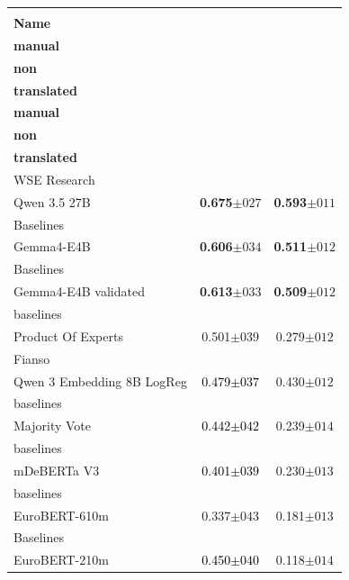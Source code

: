 \begin{tabularx}{\textwidth}{X | c c}
\hline
\makecell[b]{\textbf{Model} \\ \textbf{Name}} & \makecell[b]{\textbf{Addi} \\ \textbf{manual} \\ \textbf{non} \\ \textbf{translated}} & \makecell[b]{\textbf{PISA} \\ \textbf{manual} \\ \textbf{non} \\ \textbf{translated}} \\
\hline
WSE Research\\\subcatarrow{}Qwen 3.5 27B & \textbf{\textcolor{BrickRed}{0.675$\pm{}027$}} & \textbf{\textcolor{BrickRed}{0.593$\pm{}011$}} \\
Baselines\\\subcatarrow{}Gemma4-E4B & \textbf{\textcolor{White!50!BrickRed}{0.606$\pm{}034$}} & \textbf{\textcolor{White!50!BrickRed}{0.511$\pm{}012$}} \\
Baselines\\\subcatarrow{}Gemma4-E4B validated & \textbf{\textcolor{White!50!BrickRed}{0.613$\pm{}033$}} & \textbf{\textcolor{White!50!BrickRed}{0.509$\pm{}012$}} \\
baselines\\\subcatarrow{}Product Of Experts & \textcolor{White!50!BrickRed}{0.501$\pm{}039$} & \textcolor{White!50!NavyBlue}{0.279$\pm{}012$} \\
Fianso\\\subcatarrow{}Qwen 3 Embedding 8B LogReg & \textcolor{Black}{0.479$\pm{}037$} & \textcolor{White!50!BrickRed}{0.430$\pm{}012$} \\
baselines\\\subcatarrow{}Majority Vote & \textcolor{Black}{0.442$\pm{}042$} & \textcolor{White!50!NavyBlue}{0.239$\pm{}014$} \\
baselines\\\subcatarrow{}mDeBERTa V3 & \textcolor{Black}{0.401$\pm{}039$} & \textcolor{White!50!NavyBlue}{0.230$\pm{}013$} \\
baselines\\\subcatarrow{}EuroBERT-610m & \textcolor{White!50!NavyBlue}{0.337$\pm{}043$} & \textcolor{White!50!NavyBlue}{0.181$\pm{}013$} \\
Baselines\\\subcatarrow{}EuroBERT-210m & \textcolor{Black}{0.450$\pm{}040$} & \textcolor{NavyBlue}{0.118$\pm{}014$} \\

\end{tabularx}
